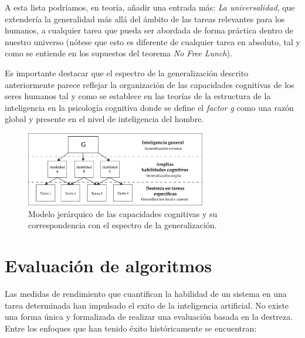 A esta lista podríamos, en teoría, añadir una entrada más: \textit{La universalidad}, que extendería la generalidad más allá del ámbito de las tareas relevantes para los humanos, a cualquier tarea que pueda ser abordada de forma práctica dentro de nuestro universo (nótese que esto es diferente de cualquier tarea en absoluto, tal y como se entiende en los supuestos del teorema \textit{No Free Lunch}). 

Es importante destacar que el espectro de la generalización descrito anteriormente parece reflejar la organización de las capacidades cognitivas de los seres humanos tal y como se establece en las teorías de la estructura de la inteligencia en la psicología cognitiva donde se define el \textit{factor g} como una razón global y presente en el nivel de inteligencia del hombre. 

\begin{figure}[ht!]
    \centering
    \includegraphics[width=0.7\textwidth]{Graphics/g-factor.png}
    \caption{Modelo jerárquico de las capacidades cognitivas y su correspondencia con el espectro de la generalización.}
    \label{fig:g-factor}
\end{figure}

\section{Evaluación de algoritmos}\label{section:state-of-the-art:evaluating-algoritms}

Las medidas de rendimiento que cuantifican la habilidad de un sistema en una tarea determinada han impulsado el exito de la inteligencia artificial. No existe una forma única y formalizada de realizar una evaluación basada en la destreza. Entre los enfoques que han tenido éxito históricamente se encuentran:

